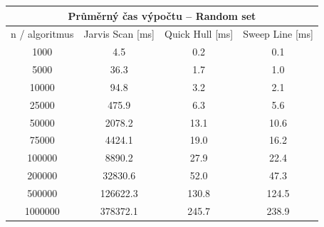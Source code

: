 \documentclass[a4paper, 12pt]{article}
\begin{document}
\begin{table}[]                                                                            
\centering                                                                                 
\begin{tabular}{|c|c|c|c|}                                                                 
\hline                                                                                     
\multicolumn{4}{|c|}{\textbf{Průměrný čas výpočtu – Random set}}                  \\ \hline
n / algoritmus & Jarvis Scan {[}ms{]} & Quick Hull {[}ms{]} & Sweep Line {[}ms{]} \\ \hline
1000           & 4.5                  & 0.2                 & 0.1                 \\ \hline
5000           & 36.3                 & 1.7                 & 1.0                 \\ \hline
10000          & 94.8                 & 3.2                 & 2.1                 \\ \hline
25000          & 475.9                & 6.3                 & 5.6                 \\ \hline
50000          & 2078.2               & 13.1                & 10.6                \\ \hline
75000          & 4424.1               & 19.0                & 16.2                \\ \hline
100000         & 8890.2               & 27.9                & 22.4                \\ \hline
200000         & 32830.6              & 52.0                & 47.3                \\ \hline
500000         & 126622.3             & 130.8               & 124.5               \\ \hline
1000000        & 378372.1             & 245.7               & 238.9               \\ \hline
\end{tabular}                                                                              
\end{table}                                                                                
                                                                                           
\end{document}

